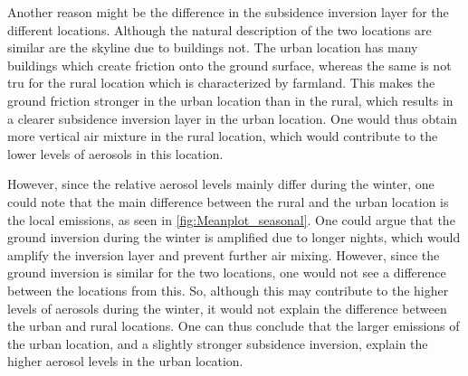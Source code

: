Another reason might be the difference in the subsidence inversion layer for the different locations. Although the natural description of the two locations are similar are the skyline due to buildings not. The urban location has many buildings which create friction onto the ground surface, whereas the same is not tru for the rural location which is characterized by farmland. This makes the ground friction stronger in the urban location than in the rural, which results in a clearer subsidence inversion layer in the urban location. One would thus obtain more vertical air mixture in the rural location, which would contribute to the lower levels of aerosols in this location. 

However, since the relative aerosol levels mainly differ during the winter, one could note that the main difference between the rural and the urban location is the local emissions, as seen in \autoref{fig:Meanplot_seasonal}. One could argue that the ground inversion during the winter is amplified due to longer nights, which would amplify the inversion layer and prevent further air mixing. However, since the ground inversion is similar for the two locations, one would not see a difference between the locations from this. So, although this may contribute to the higher levels of aerosols during the winter, it would not explain the difference between the urban and rural locations. One can thus conclude that the larger emissions of the urban location, and a slightly stronger subsidence inversion, explain the higher aerosol levels in the urban location.
